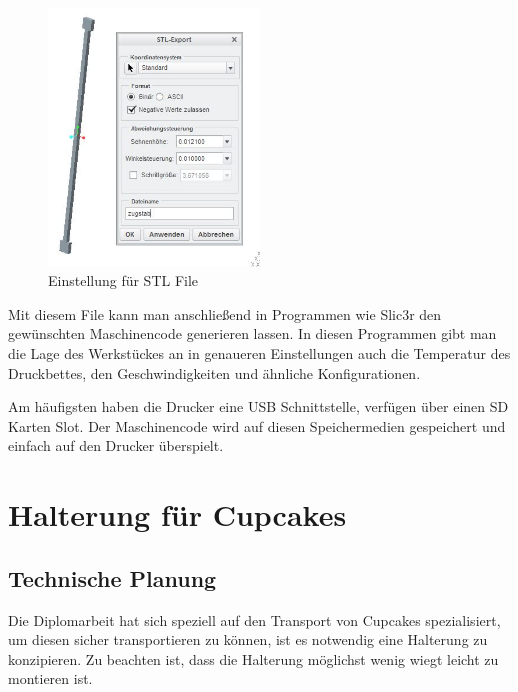 			\begin{figure}[tbh]
			\begin{centering}
			\includegraphics[width = 0.5\textwidth]{Bilder/stl_file_optionen}
			\par\end{centering}
	 		\caption{Einstellung für STL File}
			\label{stl_file_optionen}
			\end{figure}

		Mit diesem File kann man anschließend in Programmen wie Slic3r den gewünschten Maschinencode generieren lassen.
		In diesen Programmen gibt man die Lage des Werkstückes an \bzw in genaueren Einstellungen auch die Temperatur des Druckbettes, den Geschwindigkeiten und ähnliche Konfigurationen.

		Am häufigsten haben die Drucker eine USB Schnittstelle, \bzw verfügen über einen SD Karten Slot.
		Der Maschinencode wird auf diesen Speichermedien gespeichert und einfach auf den Drucker überspielt.

				\newpage


\section{Halterung für Cupcakes}

		\subsection{Technische Planung}

		Die Diplomarbeit hat sich speziell auf den Transport von Cupcakes spezialisiert, um diesen sicher transportieren zu können, ist es notwendig eine Halterung zu konzipieren.
		Zu beachten ist, dass die Halterung möglichst wenig wiegt \bzw leicht zu montieren ist.

